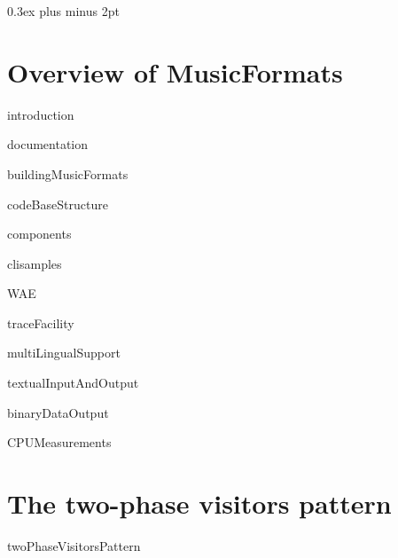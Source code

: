 \documentclass[11pt,a4paper]{report}
\begin{document}

{
	\small

  \setlength {\parskip} {0.3ex plus \baselineskip minus 2pt}

  \tableofcontents

  \listoffigures

  \lstlistoflistings
}


\part{Overview of MusicFormats}

\fancyhead[L]{\nouppercase\leftmark}
\fancyhead[C]{}
\fancyhead[R]{\nouppercase\rightmark}


{introduction}

{documentation}

{buildingMusicFormats}

{codeBaseStructure}

{components}

{clisamples}

{WAE}

{traceFacility}

{multiLingualSupport}

{textualInputAndOutput}

{binaryDataOutput}

{CPUMeasurements}


\part{The two-phase visitors pattern}

{twoPhaseVisitorsPattern}


\end{document}
